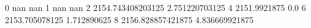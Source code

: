 0 nan nan
1 nan nan
2 2154.743408203125 2.751220703125
4 2151.9921875 0.0
6 2153.705078125 1.712890625
8 2156.828857421875 4.836669921875
